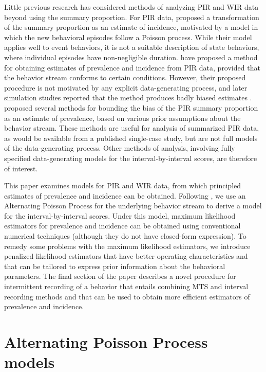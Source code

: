 \documentclass[man, noextraspace, floatsintext]{apa6}\usepackage[]{graphicx}\usepackage[]{color}
\begin{document}
Little previous research has considered methods of analyzing PIR and WIR data beyond using the summary proportion.
For PIR data, \citet{Altmann1970estimating} proposed a transformation of the summary proportion as an estimate of incidence, motivated by a model in which the new behavioral episodes follow a Poisson process. While their model applies well to event behaviors, it is not a suitable description of state behaviors, where individual episodes have non-negligible duration. 
\citet{Suen1986post, Suen1989analyzing} have proposed a method for obtaining estimates of prevalence and incidence from PIR data, provided that the behavior stream conforms to certain conditions. 
However, their proposed procedure is not motivated by any explicit data-generating process, and later simulation studies reported that the method produces badly biased estimates \citep[sec. 5.2]{Rogosa1991statistical}. 
\citet{Pustejovsky2014four} proposed several methods for bounding the bias of the PIR summary proportion as an estimate of prevalence, based on various prior assumptions about the behavior stream. 
These methods are useful for analysis of summarized PIR data, as would be available from a published single-case study, but are not full models of the data-generating process.
Other methods of analysis, involving fully specified data-generating models for the interval-by-interval scores, are therefore of interest.

This paper examines models for PIR and WIR data, from which principled estimates of prevalence and incidence can be obtained. 
Following \citet{Brown1977estimation}, we use an Alternating Poisson Process for the underlying behavior stream to derive a model for the interval-by-interval scores. 
Under this model, maximum likelihood estimators for prevalence and incidence can be obtained using conventional numerical techniques (although they do not have closed-form expression). 
To remedy some problems with the maximum likelihood estimators, we introduce penalized likelihood estimators that have better operating characteristics and that can be tailored to express prior information about the behavioral parameters.
The final section of the paper describes a novel procedure for intermittent recording of a behavior that entails combining MTS and interval recording methods and that can be used to obtain more efficient estimators of prevalence and incidence.

\section{Alternating Poisson Process models}
\label{sec:APP}
\end{document}
